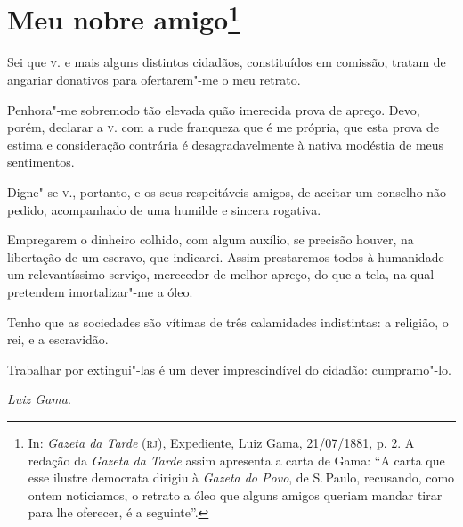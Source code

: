 \chapter{Meu nobre amigo\footnote[*]{In: \emph{Gazeta da Tarde} (\textsc{rj}),
  Expediente, Luiz Gama, 21/07/1881, p. 2. A redação da \emph{Gazeta da
  Tarde} assim apresenta a carta de Gama: ``A carta que esse ilustre
  democrata dirigiu à \emph{Gazeta do Povo}, de S.\,Paulo, recusando,
  como ontem noticiamos, o retrato a óleo que alguns amigos queriam
  mandar tirar para lhe oferecer, é a seguinte''.}}


Sei que \textsc{v}. e mais alguns distintos cidadãos, constituídos em comissão, tratam de angariar donativos para ofertarem"-me o meu retrato.

Penhora"-me sobremodo tão elevada quão imerecida prova de apreço. Devo,
porém, declarar a \textsc{v}. com a rude franqueza que é me própria, que esta
prova de estima e consideração contrária é desagradavelmente à nativa
modéstia de meus sentimentos.

Digne"-se \textsc{v}., portanto, e os seus respeitáveis amigos, de aceitar um
conselho não pedido, acompanhado de uma humilde e sincera rogativa.

Empregarem o dinheiro colhido, com algum auxílio, se precisão houver, na
libertação de um escravo, que indicarei. Assim prestaremos todos à
humanidade um relevantíssimo serviço, merecedor de melhor apreço, do que
a tela, na qual pretendem imortalizar"-me a óleo.

Tenho que as sociedades são vítimas de três calamidades indistintas: a
religião, o rei, e a escravidão.

Trabalhar por extingui"-las é um dever imprescindível do cidadão:
cumpramo"-lo.


\hfill\emph{Luiz Gama}.

\paginabranca
\mbox{}\vfill
\thispagestyle{empty}

